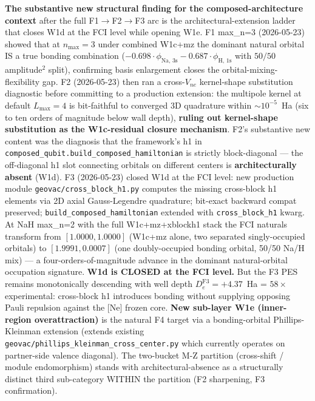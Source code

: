 \documentclass[aps,pra,twocolumn,superscriptaddress,longbibliography,floatfix]{revtex4-2}
\begin{document}
\textbf{The substantive new structural finding for the composed-architecture
context} after the full F1$\to$F2$\to$F3 arc is the architectural-extension
ladder that closes W1d at the FCI level while opening W1e. F1 max\_n=3
(2026-05-23) showed that at $n_{\max}=3$ under combined W1c+mz the dominant
natural orbital IS a true bonding combination ($-0.698 \cdot
\phi_\text{Na, 3s} - 0.687 \cdot \phi_\text{H, 1s}$ with $50/50$
amplitude$^2$ split), confirming basis enlargement closes the
orbital-mixing-flexibility gap. F2 (2026-05-23) then ran a cross-$V_{ne}$
kernel-shape substitution diagnostic before committing to a production
extension: the multipole kernel at default $L_\text{max}=4$ is bit-faithful
to converged 3D quadrature within $\sim 10^{-5}$~Ha (six to ten orders of
magnitude below wall depth), \textbf{ruling out kernel-shape substitution
as the W1c-residual closure mechanism}. F2's substantive new content was
the diagnosis that the framework's h1 in
\texttt{composed\_qubit.build\_composed\_hamiltonian} is strictly
block-diagonal --- the off-diagonal h1 slot connecting orbitals on different
centers is \textbf{architecturally absent} (W1d). F3 (2026-05-23) closed
W1d at the FCI level: new production module
\texttt{geovac/cross\_block\_h1.py} computes the missing cross-block h1
elements via 2D axial Gauss-Legendre quadrature; bit-exact backward compat
preserved; \texttt{build\_composed\_hamiltonian} extended with
\texttt{cross\_block\_h1} kwarg. At NaH max\_n=2 with the full
W1c+mz+xblockh1 stack the FCI naturals transform from $[1.0000, 1.0000]$
(W1c+mz alone, two separated singly-occupied orbitals) to
$[\mathbf{1.9991}, \mathbf{0.0007}]$ (one doubly-occupied bonding orbital,
50/50 Na/H mix) --- a four-orders-of-magnitude advance in the dominant
natural-orbital occupation signature. \textbf{W1d is CLOSED at the FCI
level.} But the F3 PES remains monotonically descending with well depth
$D_e^\text{F3} = +4.37$~Ha = $58\times$ experimental: cross-block h1
introduces bonding without supplying opposing Pauli repulsion against the
[Ne] frozen core. \textbf{New sub-layer W1e (inner-region overattraction)}
is the natural F4 target via a bonding-orbital Phillips-Kleinman extension
(extends existing \texttt{geovac/phillips\_kleinman\_cross\_center.py}
which currently operates on partner-side valence diagonal). The two-bucket
M-Z partition (cross-shift / module endomorphism) stands with
architectural-absence as a structurally distinct third sub-category WITHIN
the partition (F2 sharpening, F3 confirmation).
\end{document}

